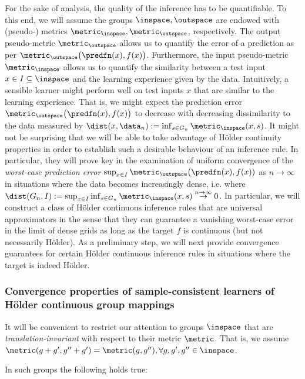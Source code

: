 For the sake of analysis, the quality of the inference has to be quantifiable. To this end, we will assume the groups $\inspace, \outspace$ are endowed with (pseudo-) metrics $\metric_\inspace,\metric_{\outspace}$, respectively. The output pseudo-metric $\metric_\outspace$ allows us to quantify the error of a prediction as per $\metric_{\outspace} \bigl(\predfn(x),f(x) \bigr) $.
Furthermore, the input pseudo-metric $\metric_\inspace$ allows us to quantify the similarity between a test input $x \in I\subseteq \inspace$ and the learning experience given by the data. Intuitively, a sensible learner might perform well on test inputs $x$ that are similar to the learning experience. That is, we might expect the prediction error  $\metric_{\outspace} \bigl(\predfn(x),f(x) \bigr) $ to decrease with decreasing dissimilarity to the data measured by $\dist(x,\data_n) := \inf_{s \in G_n}  \metric_\inspace(x,s)$. It might not be surprising that we will be able to take advantage of H\"older continuity properties in order to establish such a desirable behaviour of an inference rule. 
In particular, they will prove key in the examination of uniform convergence of the \emph{worst-case prediction error} 
% 
$\sup_{x\in I} \metric_{\outspace} \bigl( \predfn(x), f(x) )$ as $n \to \infty$ in situations where 
the data becomes increasingly dense, i.e. where $\dist(G_n,I):= \sup_{x \in I} \inf_{s \in G_n} \metric_\inspace(x,s)  \stackrel{n \to \infty}{\rightarrow} 0$. In particular, we will construct a class of H\"older continuous inference rules that are universal approximators in the sense that they can guarantee a vanishing worst-case error in the limit of dense grids as long as the target $f$ is continuous (but not necessarily H\"older).
As a preliminary step, we will next provide convergence guarantees for certain H\"older continuous inference rules in situations where the target is indeed H\"older.

\subsubsection{Convergence properties of sample-consistent learners of H\"older continuous group mappings}

It will be convenient to restrict our attention to groups $\inspace$ that are \emph{translation-invariant} with respect to their metric $\metric$. That is, we assume $ \metric(g+g',g''+g') = \metric(g,g''),\forall g,g',g'' \in \inspace$.

In such groups the following holds true:


